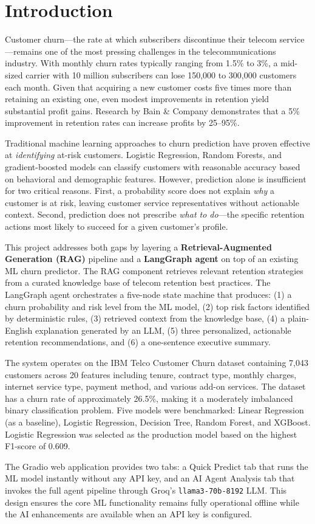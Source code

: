 \section{Introduction}

Customer churn---the rate at which subscribers discontinue their telecom service---remains one
of the most pressing challenges in the telecommunications industry. With monthly churn rates
typically ranging from 1.5\% to 3\%, a mid-sized carrier with 10 million subscribers can lose
150,000 to 300,000 customers each month. Given that acquiring a new customer costs five times
more than retaining an existing one, even modest improvements in retention yield substantial
profit gains. Research by Bain \& Company demonstrates that a 5\% improvement in retention
rates can increase profits by 25--95\%.

Traditional machine learning approaches to churn prediction have proven effective at
\textit{identifying} at-risk customers. Logistic Regression, Random Forests, and gradient-boosted
models can classify customers with reasonable accuracy based on behavioral and demographic
features. However, prediction alone is insufficient for two critical reasons. First, a
probability score does not explain \textit{why} a customer is at risk, leaving customer service
representatives without actionable context. Second, prediction does not prescribe \textit{what
to do}---the specific retention actions most likely to succeed for a given customer's profile.

This project addresses both gaps by layering a \textbf{Retrieval-Augmented Generation (RAG)}
pipeline and a \textbf{LangGraph agent} on top of an existing ML churn predictor. The RAG
component retrieves relevant retention strategies from a curated knowledge base of telecom
retention best practices. The LangGraph agent orchestrates a five-node state machine that
produces: (1) a churn probability and risk level from the ML model, (2) top risk factors
identified by deterministic rules, (3) retrieved context from the knowledge base, (4) a
plain-English explanation generated by an LLM, (5) three personalized, actionable retention
recommendations, and (6) a one-sentence executive summary.

The system operates on the IBM Telco Customer Churn dataset containing 7,043 customers
across 20 features including tenure, contract type, monthly charges, internet service type,
payment method, and various add-on services. The dataset has a churn rate of approximately
26.5\%, making it a moderately imbalanced binary classification problem. Five models were
benchmarked: Linear Regression (as a baseline), Logistic Regression, Decision Tree, Random
Forest, and XGBoost. Logistic Regression was selected as the production model based on the
highest F1-score of 0.609.

The Gradio web application provides two tabs: a Quick Predict tab that runs the ML model
instantly without any API key, and an AI Agent Analysis tab that invokes the full agent
pipeline through Groq's \texttt{llama3-70b-8192} LLM. This design ensures the core ML
functionality remains fully operational offline while the AI enhancements are available
when an API key is configured.
